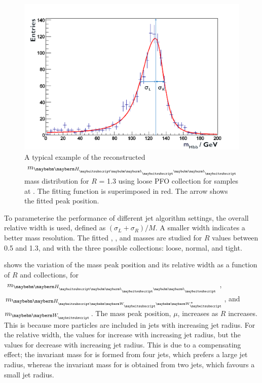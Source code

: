 \begin{figure}[!htbp]
\includegraphics[width=\largefigwidth]{doubleHiggs/MCmassFit2}
\caption[Example MC mass fit for jet optimisation in double Higgs analysis]%
   {A typical example of the reconstructed $m_{\Hbb}$  mass distribution for $R$ = 1.3 using loose PFO collection for \eeToHHbbWWHad samples at .  The fitting function is superimposed in red. The arrow shows the fitted peak position. }
   \label{fig:doubleHiggsFitMCMass}
\end{figure}


To parameterise the performance of different jet algorithm settings, the overall relative width is used, defined as $\left(\sigma_L  + \sigma_R\right)/M$. A smaller width indicates a  better mass resolution. The fitted \Hbb, \HWW, and \PW masses are studied for $R$ values between 0.5 and 1.3, and with the three possible \PFO collections: loose, normal, and tight.


 shows the variation of the mass peak position and its relative width as a function of $R$ and \PFO collections, for $m_{\Hbb}$, $m_{\HWW}$, and $m_{\PW}$. The mass peak position, $\mu$, increases as $R$ increases. This is because more particles are included in jets with increasing jet radius. For the relative width, the values for \Hbb  increase with increasing jet radius, but the values for \HWW decrease  with increasing jet radius. This is due to a compensating effect; the invariant mass for \HWW is formed from four jets, which prefers a large jet radius, whereas the invariant mass for \Hbb is obtained from two jets, which favours a small jet radius.

